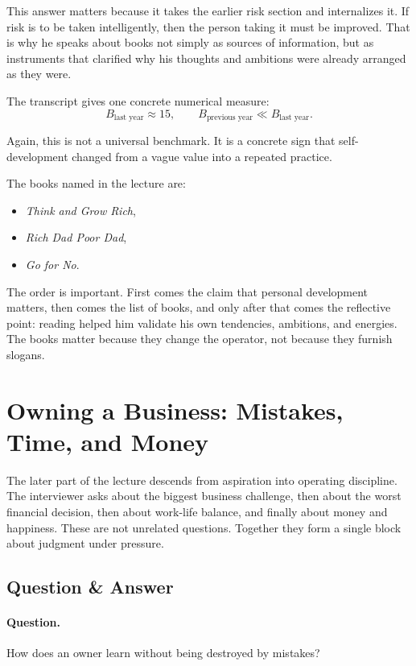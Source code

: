 This answer matters because it takes the earlier risk section and internalizes it. If risk is to be taken intelligently, then the person taking it must be improved. That is why he speaks about books not simply as sources of information, but as instruments that clarified why his thoughts and ambitions were already arranged as they were.

The transcript gives one concrete numerical measure:
\begin{equation}
B_{\text{last year}} \approx 15,
\qquad
B_{\text{previous year}} \ll B_{\text{last year}}.
\end{equation}

Again, this is not a universal benchmark. It is a concrete sign that self-development changed from a vague value into a repeated practice.

The books named in the lecture are:
\begin{itemize}
\item \textit{Think and Grow Rich},
\item \textit{Rich Dad Poor Dad},
\item \textit{Go for No}.
\end{itemize}

The order is important. First comes the claim that personal development matters, then comes the list of books, and only after that comes the reflective point: reading helped him validate his own tendencies, ambitions, and energies. The books matter because they change the operator, not because they furnish slogans.

\section{Owning a Business: Mistakes, Time, and Money}

The later part of the lecture descends from aspiration into operating discipline. The interviewer asks about the biggest business challenge, then about the worst financial decision, then about work-life balance, and finally about money and happiness. These are not unrelated questions. Together they form a single block about judgment under pressure.

\subsection{Question \& Answer}

\paragraph{Question.} How does an owner learn without being destroyed by mistakes?

